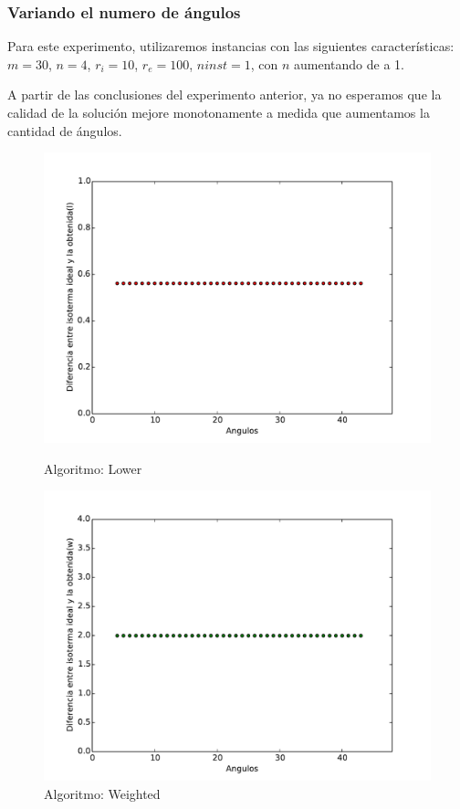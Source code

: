 \pagebreak

\subsubsection{Variando el numero de ángulos}

Para este experimento, utilizaremos instancias con las siguientes características: $m = 30$, $n = 4$, $r_i = 10$, $r_e = 100$, $ninst = 1$, con $n$ aumentando de a 1.

A partir de las conclusiones del experimento anterior, ya no esperamos que la calidad de la solución mejore monotonamente a medida que aumentamos la cantidad de ángulos.

\begin{figure}[h]
  \centering
  \begin{minipage}[b]{0.49\textwidth}
    \includegraphics[width=\textwidth]{graficos/nVariable_l.pdf}
    \caption{Algoritmo: Lower}
  \end{minipage}
  \hfill
  \begin{minipage}[b]{0.49\textwidth}
    \includegraphics[width=\textwidth]{graficos/nVariable_w.pdf}
    \caption{Algoritmo: Weighted}
  \end{minipage}
\end{figure}

